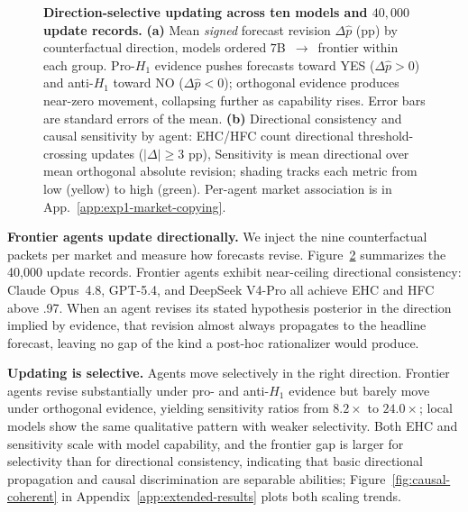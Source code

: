 \documentclass{article} %
\begin{document}
\begin{figure}[t]
\begin{subfigure}[c]{0.48\textwidth}
\caption{}
\label{fig:exp1-table}
\end{subfigure}
\vspace{-1em}
\caption{\textbf{Direction-selective updating across ten models and $40{,}000$ update records.}
\textbf{(a)} Mean \emph{signed} forecast revision $\Delta\hat{p}$ (pp) by counterfactual direction, models ordered $7$B~$\rightarrow$~frontier within each group. Pro-$H_1$ evidence pushes forecasts toward YES ($\Delta\hat p>0$) and anti-$H_1$ toward NO ($\Delta\hat p<0$); orthogonal evidence produces near-zero movement, collapsing further as capability rises. Error bars are standard errors of the mean.
\textbf{(b)} Directional consistency and causal sensitivity by agent: EHC/HFC count directional threshold-crossing updates ($|\Delta|\geq3$ pp), Sensitivity is mean directional over mean orthogonal absolute revision; shading tracks each metric from low (yellow) to high (green). Per-agent market association is in App.~\ref{app:exp1-market-copying}.}
\label{fig:exp1-updating}
\end{figure}

\textbf{Frontier agents update directionally.} We inject the nine counterfactual packets per market and measure how forecasts revise. Figure~\ref{fig:exp1-updating} summarizes the 40{,}000 update records. Frontier agents exhibit near-ceiling directional consistency: Claude Opus~4.8, GPT-5.4, and DeepSeek V4-Pro all achieve EHC and HFC above .97. When an agent revises its stated hypothesis posterior in the direction implied by evidence, that revision almost always propagates to the headline forecast, leaving no gap of the kind a post-hoc rationalizer would produce.


\textbf{Updating is selective.} Agents move selectively in the right direction. Frontier agents revise substantially under pro- and anti-$H_1$ evidence but barely move under orthogonal evidence, yielding sensitivity ratios from $8.2\times$ to $24.0\times$; local models show the same qualitative pattern with weaker selectivity. Both EHC and sensitivity scale with model capability, and the frontier gap is larger for selectivity than for directional consistency, indicating that basic directional propagation and causal discrimination are separable abilities; Figure~\ref{fig:causal-coherent} in Appendix~\ref{app:extended-results} plots both scaling trends.



\end{document}
